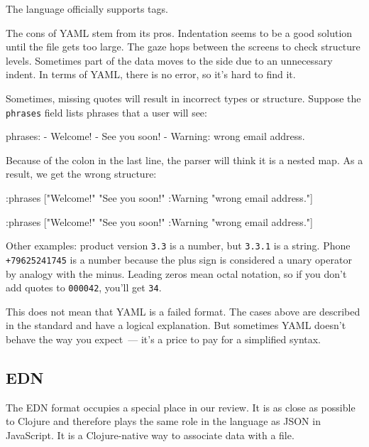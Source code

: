 The language officially supports tags.


The cons of YAML stem from its pros. Indentation seems to be a good solution until the file gets too large. The gaze hops between the screens to check structure levels. Sometimes part of the data moves to the side due to an unnecessary indent. In terms of YAML, there is no error, so it's hard to find it.

Sometimes, missing quotes will result in incorrect types or structure. Suppose the \verb|phrases| field lists phrases that a user will see:

\begin{yaml}
phrases:
  - Welcome!
  - See you soon!
  - Warning: wrong email address.
\end{yaml}

Because of the colon in the last line, the parser will think it is a nested map. As a result, we get the wrong structure:

\ifnarrow

\begin{clojure}
{:phrases
 ["Welcome!"
  "See you soon!"
  {:Warning "wrong email address."}]}
\end{clojure}

\else

\begin{clojure}
{:phrases ["Welcome!"
           "See you soon!"
           {:Warning "wrong email address."}]}
\end{clojure}

\fi

Other examples: product version \verb|3.3| is a number, but \verb|3.3.1| is a string. Phone \texttt{+79625241745} is a number because the plus sign is considered a unary operator by analogy with the minus. Leading zeros mean octal notation, so if you don't add quotes to \verb|000042|, you'll get \verb|34|.

This does not mean that YAML is a failed format. The cases above are described in the standard and have a logical explanation. But sometimes YAML doesn't behave the way you expect~--- it’s a price to pay for a simplified syntax.

\subsection{EDN}


The EDN format occupies a special place in our review. It is as close as possible to Clojure and therefore plays the same role in the language as JSON in JavaScript. It is a Clojure-native way to associate data with a file.

